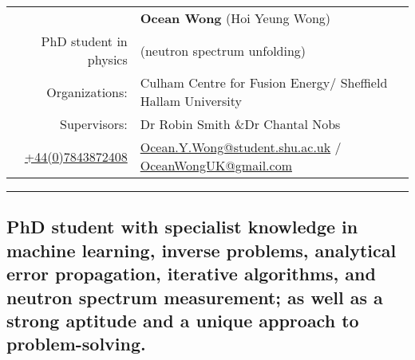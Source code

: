 \documentclass[a4paper, 12pt]{article}
\begin{document}
\begin{table}[H]
\centering
\begin{tabular}{rl}
&\textbf{Ocean Wong} (Hoi Yeung Wong)    \\
PhD student in physics& (neutron spectrum unfolding) \\
Organizations: &Culham Centre for Fusion Energy/ Sheffield Hallam University\\
Supervisors: &Dr Robin Smith \&Dr Chantal Nobs\\
\href{tel:07843872408}{+44(0)7843872408} & \href{mailto:Ocean.Y.Wong@student.shu.ac.uk}{Ocean.Y.Wong@student.shu.ac.uk} / \href{mailto:OceanWongUK@gmail.com}{OceanWongUK@gmail.com}
\end{tabular}
\end{table}
\hrule
\begin{center}
\chapter{PhD student with specialist knowledge in machine learning, inverse problems, analytical error propagation, iterative algorithms, and neutron spectrum measurement; as well as a strong aptitude and a unique approach to problem-solving.\\ %
}
\end{center}
\end{document}
